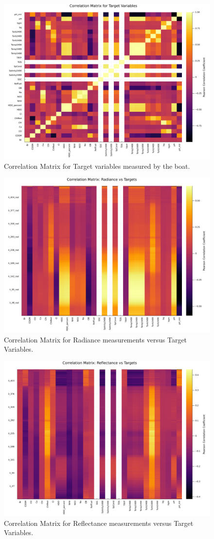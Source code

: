 \documentclass[remotesensing,article,submit,pdftex,moreauthors]{Definitions/mdpi}
\begin{document}
\begin{figure}[H]
\includegraphics[width=10.5 cm]{images/correlation/target_cor.png}
\caption{Correlation Matrix for Target variables measured by the boat.\label{target_cor}}
\end{figure}   

\begin{figure}[H]
\includegraphics[width=10.5 cm]{images/correlation/radiance_cor.png}
\caption{Correlation Matrix for Radiance measurements versus Target Variables.\label{rad_cor}}
\end{figure}   

\begin{figure}[H]
\includegraphics[width=10.5 cm]{images/correlation/reflectance_cor.png}
\caption{Correlation Matrix for Reflectance measurements versus Target Variables.\label{ref_cor}}
\end{figure}   
\end{document}
